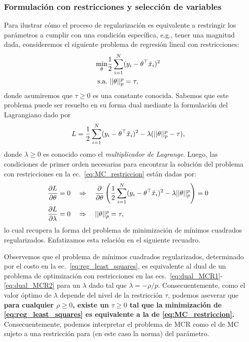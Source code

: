 \subsubsection{Formulación con restricciones y selección de variables} %
\label{sub:restricciones}

Para ilustrar cómo el proceso de regularización es equivalente a restringir los parámetros a cumplir con una condición específica, e.g., tener una magnitud dada, consideremos el siguiente problema de regresión lineal con restricciones:
\begin{align}
	\min_\theta &\frac{1}{2}\sum_{i=1}^N (y_i-\theta^\top\tilde{x}_i)^2\label{eq:MC_restriccion}\\
	\text{s.a.} &\ ||\theta||_p^p = \tau,\nonumber
\end{align}
donde asumiremos que $\tau\geq0$ es una constante conocida. Sabemos que este problema puede ser resuelto en su forma dual mediante la formulación del Lagrangiano dado por 
\begin{equation}
	L = \frac{1}{2}\sum_{i=1}^N (y_i-\theta^\top\tilde{x}_i)^2 - \lambda (||\theta||_p^p - \tau),
\end{equation}
donde $\lambda\geq0$ es conocido como el \emph{multiplicador de Lagrange}. Luego, las condiciones de primer orden necesarias para encontrar la solución del problema con restricciones en la ec.~\eqref{eq:MC_restriccion} están dadas por: 
\begin{align}
	\frac{\partial L}{\partial \theta} = 0 &\quad\Rightarrow\quad  \frac{\partial }{\partial \theta}\left( \frac{1}{2}\sum_{i=1}^N (y_i-\theta^\top\tilde{x}_i)^2 - \lambda ||\theta||_p^p \right) = 0\label{eq:dual_MCR1}\\
	\frac{\partial L}{\partial \lambda} = 0 &\quad\Rightarrow\quad ||\theta||_p^p = \tau, \label{eq:dual_MCR2}
\end{align}
lo cual recupera la forma del problema de minimización de mínimos cuadrados regularizados. Enfatizamos esta relación en el siguiente recuadro. 


\begin{mdframed}[style=discusion, frametitle={\center Mínimos cuadrados regularizados: optimización con restricciones}]
Observemos que el problema de mínimos cuadrados regularizados, determinado por el costo en la ec.~\eqref{eq:reg_least_squares}, es equivalente al dual de un problema de optimización con restricciones en las ecs.~\eqref{eq:dual_MCR1}-\eqref{eq:dual_MCR2} para un $\lambda$ dado tal que $\lambda =-{\rho}/{p}$. Consecuentemente, como el valor óptimo de $\lambda$ depende del nivel de la restricción $\tau$, podemos aseverar que \textbf{para cualquier $\rho\geq0$, existe un $\tau\geq0$ tal que la minimización de \eqref{eq:reg_least_squares} es equivalente a la de \eqref{eq:MC_restriccion}.} Consecuentemente,  podemos interpretar el problema de MCR como el de MC sujeto a una restricción para (en este caso la norma) del parámetro. 
	
\end{mdframed}

